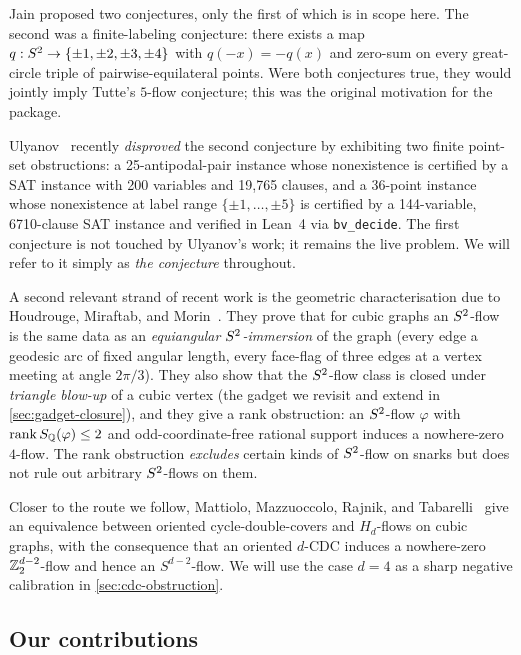 Jain proposed two conjectures, only the first of which is in scope
here. The second was a finite-labeling conjecture: there exists a map
$q : S^{2} \to \{\pm 1, \pm 2, \pm 3, \pm 4\}$ with $q(-x) = -q(x)$
and zero-sum on every great-circle triple of pairwise-equilateral
points. Were both conjectures true, they would jointly imply Tutte's
$5$-flow conjecture; this was the original motivation for the package.

Ulyanov~\cite{Uly26} recently \emph{disproved} the second conjecture
by exhibiting two finite point-set obstructions:
a 25-antipodal-pair instance whose nonexistence is certified by a SAT
instance with 200 variables and 19{,}765 clauses, and a 36-point
instance whose nonexistence at label range $\{\pm 1, \dots, \pm 5\}$
is certified by a 144-variable, 6710-clause SAT instance and verified
in Lean~4 via \texttt{bv\_decide}. The first conjecture is not touched
by Ulyanov's work; it remains the live problem. We will refer to it
simply as \emph{the conjecture} throughout.

A second relevant strand of recent work is the geometric
characterisation due to Houdrouge, Miraftab, and Morin~\cite{HMM26}.
They prove that for cubic graphs an $S^{2}$-flow is the same data as
an \emph{equiangular $S^{2}$-immersion} of the graph (every edge a
geodesic arc of fixed angular length, every face-flag of three edges
at a vertex meeting at angle $2\pi/3$). They also show that the
$S^{2}$-flow class is closed under \emph{triangle blow-up} of a
cubic vertex (the gadget we revisit and extend in
\cref{sec:gadget-closure}), and they give a rank obstruction: an
$S^{2}$-flow $\varphi$ with $\operatorname{rank} S_{\mathbb{Q}}(\varphi) \le 2$ and
odd-coordinate-free rational support induces a nowhere-zero $4$-flow.
The rank obstruction \emph{excludes} certain kinds of $S^{2}$-flow
on snarks but does not rule out arbitrary $S^{2}$-flows on them.

Closer to the route we follow, Mattiolo, Mazzuoccolo, Rajnik, and
Tabarelli~\cite{MMRT25} give an equivalence between oriented
cycle-double-covers and $H_d$-flows on cubic graphs, with the
consequence that an oriented $d$-CDC induces a nowhere-zero
$\mathbb{Z}_2^{d-2}$-flow and hence an $S^{d-2}$-flow. We will use the case
$d = 4$ as a sharp negative calibration in
\cref{sec:cdc-obstruction}.

\subsection{Our contributions}
\label{sec:intro-contributions}

